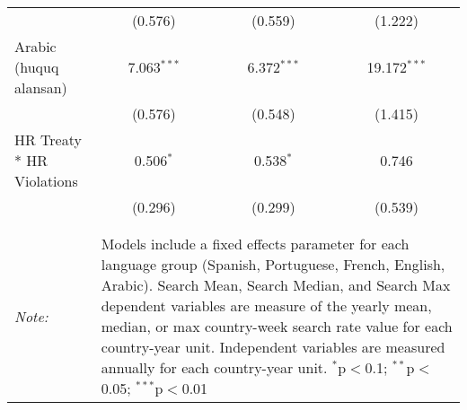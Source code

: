 \begin{table}[!htbp]
\begin{tabular}{@{\extracolsep{5pt}}lccc}
  & (0.576) & (0.559) & (1.222) \\ 
  Arabic (huquq alansan) & 7.063$^{***}$ & 6.372$^{***}$ & 19.172$^{***}$ \\ 
  & (0.576) & (0.548) & (1.415) \\ 
  HR Treaty * HR Violations & 0.506$^{*}$ & 0.538$^{*}$ & 0.746 \\ 
  & (0.296) & (0.299) & (0.539) \\ 
 \hline \\[-1.8ex] 
\hline 
\hline \\[-1.8ex] 
\textit{Note:}  & \multicolumn{3}{l}{\parbox[t]{8cm}{Models include a fixed effects parameter for each language group (Spanish, Portuguese, French, English, Arabic). Search Mean, Search Median, and Search Max dependent variables are measure of the yearly mean, median, or max country-week search rate value for each country-year unit. Independent variables are measured annually for each country-year unit. $^{*}$p$<$0.1; $^{**}$p$<$0.05; $^{***}$p$<$0.01}} \\ 
\end{tabular} 
\end{table} 
